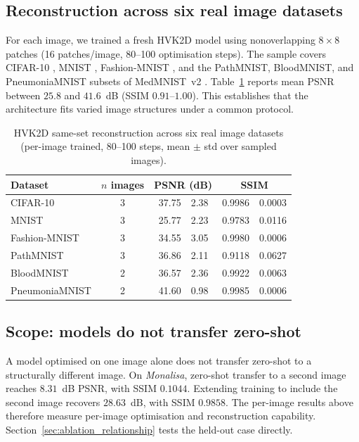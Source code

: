 \documentclass[pdflatex,sn-basic]{sn-jnl}
\begin{document}
\color{blue}
\subsection{Reconstruction across six real image datasets}
\label{sec:sameset_results}

For each image, we trained a fresh HVK2D model using nonoverlapping $8\times8$
patches (16 patches/image, 80--100 optimisation steps). The sample covers
CIFAR-10 \citep{Krizhevsky2009}, MNIST \citep{LeCun1998}, Fashion-MNIST
\citep{Xiao2017}, and the PathMNIST, BloodMNIST, and PneumoniaMNIST subsets of
MedMNIST~v2 \citep{Yang2023}. Table~\ref{tab:sameset_multi_dataset} reports mean
PSNR between $25.8$ and $41.6$~dB (SSIM $0.91$--$1.00$). This establishes that
the architecture fits varied image structures under a common protocol.

\begin{table}[t]
  \centering
  \caption{HVK2D same-set reconstruction across six real image datasets
           (per-image trained, 80--100 steps, mean $\pm$ std over sampled
           images).}
  \label{tab:sameset_multi_dataset}
  \begin{tabular}{@{}l c r@{\,$\pm$\,}l r@{\,$\pm$\,}l@{}}
    \toprule
    Dataset          & $n$ images & \multicolumn{2}{c}{PSNR (dB)} & \multicolumn{2}{c}{SSIM} \\
    \midrule
    CIFAR-10         & 3 & 37.75 & 2.38 & 0.9986 & 0.0003 \\
    MNIST            & 3 & 25.77 & 2.23 & 0.9783 & 0.0116 \\
    Fashion-MNIST    & 3 & 34.55 & 3.05 & 0.9980 & 0.0006 \\
    PathMNIST        & 3 & 36.86 & 2.11 & 0.9118 & 0.0627 \\
    BloodMNIST       & 2 & 36.57 & 2.36 & 0.9922 & 0.0063 \\
    PneumoniaMNIST   & 2 & 41.60 & 0.98 & 0.9985 & 0.0006 \\
    \bottomrule
  \end{tabular}
\end{table}



\subsection{Scope: models do not transfer zero-shot}
\label{sec:no_generalization}

A model optimised on one image alone does not transfer zero-shot to a
structurally different image. On \textit{Monalisa}, zero-shot transfer to a
second image reaches $8.31$~dB PSNR, with SSIM $0.1044$. Extending training to
include the second image recovers $28.63$~dB, with SSIM $0.9858$. The per-image
results above therefore measure per-image optimisation and reconstruction
capability. Section~\ref{sec:ablation_relationship} tests the held-out case
directly.
\end{document}
